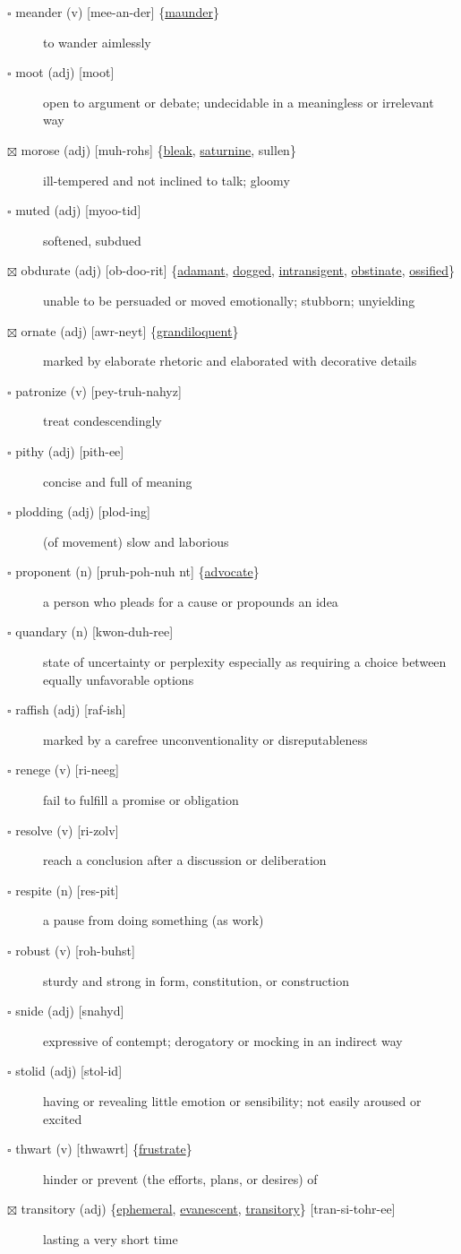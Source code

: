 \documentclass[11pt]{article}
\begin{document}
\begin{description}
\item[{$\square$ \label{orgac026bf}meander (v) [mee-an-der] \{\hyperref[org781ed7c]{maunder}\}}] to wander aimlessly
\item[{$\square$ moot (adj) [moot]}] open to argument or debate; undecidable in a meaningless or irrelevant way
\item[{$\boxtimes$ \label{orge33fcaf}morose (adj) [muh-rohs] \{\hyperref[org37831d4]{bleak}, \hyperref[orgb873785]{saturnine}, sullen\}}] ill-tempered and not inclined to talk; gloomy
\item[{$\square$ muted (adj) [myoo-tid]}] softened, subdued
\item[{$\boxtimes$ \label{orgbe450f7}obdurate (adj) [ob-doo-rit] \{\hyperref[org45fd4bf]{adamant}, \hyperref[orgbdc7eb3]{dogged}, \hyperref[org72248e8]{intransigent}, \hyperref[orgf57f0fc]{obstinate}, \hyperref[org2092cc9]{ossified}\}}] unable to be persuaded or moved emotionally; stubborn; unyielding
\item[{$\boxtimes$ \label{orgdab45ee}ornate (adj) [awr-neyt] \{\hyperref[org409e1f2]{grandiloquent}\}}] marked by elaborate rhetoric and elaborated with decorative details
\item[{$\square$ patronize (v) [pey-truh-nahyz]}] treat condescendingly
\item[{$\square$ pithy (adj) [pith-ee]}] concise and full of meaning
\item[{$\square$ plodding (adj) [plod-ing]}] (of movement) slow and laborious
\item[{$\square$ \label{org8c77071}proponent (n) [pruh-poh-nuh nt] \{\hyperref[org63e2995]{advocate}\}}] a person who pleads for a cause or propounds an idea
\item[{$\square$ quandary (n) [kwon-duh-ree]}] state of uncertainty or perplexity especially as requiring a choice between equally unfavorable options
\item[{$\square$ raffish (adj) [raf-ish]}] marked by a carefree unconventionality or disreputableness
\item[{$\square$ renege (v) [ri-neeg]}] fail to fulfill a promise or obligation
\item[{$\square$ resolve (v) [ri-zolv]}] reach a conclusion after a discussion or deliberation
\item[{$\square$ respite (n) [res-pit]}] a pause from doing something (as work)
\item[{$\square$ robust (v) [roh-buhst]}] sturdy and strong in form, constitution, or construction
\item[{$\square$ snide (adj) [snahyd]}] expressive of contempt; derogatory or mocking in an indirect way
\item[{$\square$ stolid (adj) [stol-id]}] having or revealing little emotion or sensibility; not easily aroused or excited
\item[{$\square$ \label{org7d329ca}thwart (v) [thwawrt] \{\hyperref[orgf536104]{frustrate}\}}] hinder or prevent (the efforts, plans, or desires) of
\item[{$\boxtimes$ \label{org51c6a20}transitory (adj) \{\hyperref[org70165c8]{ephemeral}, \hyperref[orgf68fa16]{evanescent}, \hyperref[org51c6a20]{transitory}\} [tran-si-tohr-ee]}] lasting a very short time
\end{description}
\end{document}

